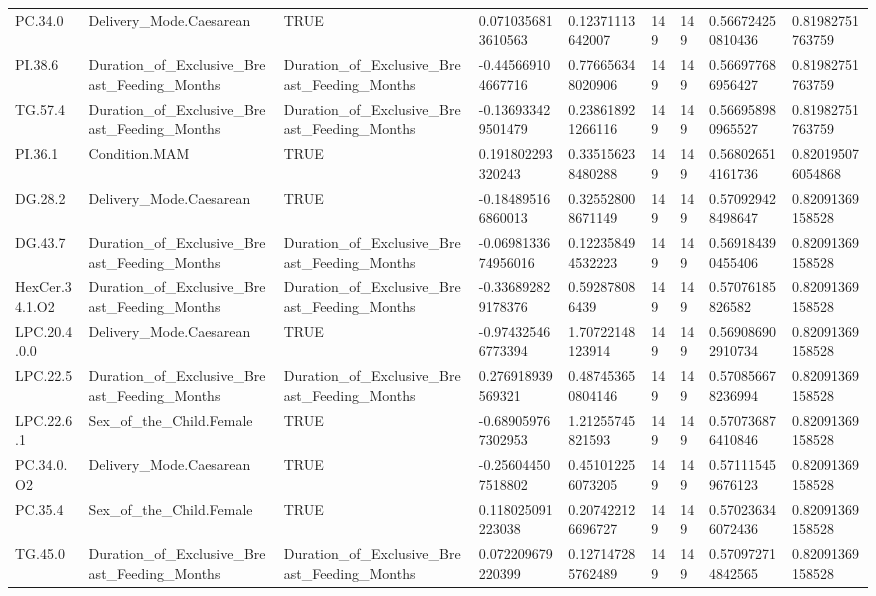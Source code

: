 \begin{longtable}{lllllllll}
PC.34.0 & Delivery\_Mode.Caesarean & TRUE & 0.0710356813610563 & 0.12371113642007 & 149 & 149 & 0.566724250810436 & 0.81982751763759 \\
PI.38.6 & Duration\_of\_Exclusive\_Breast\_Feeding\_Months & Duration\_of\_Exclusive\_Breast\_Feeding\_Months & -0.445669104667716 & 0.776656348020906 & 149 & 149 & 0.566977686956427 & 0.81982751763759 \\
TG.57.4 & Duration\_of\_Exclusive\_Breast\_Feeding\_Months & Duration\_of\_Exclusive\_Breast\_Feeding\_Months & -0.136933429501479 & 0.238618921266116 & 149 & 149 & 0.566958980965527 & 0.81982751763759 \\
PI.36.1 & Condition.MAM & TRUE & 0.191802293320243 & 0.335156238480288 & 149 & 149 & 0.568026514161736 & 0.820195076054868 \\
DG.28.2 & Delivery\_Mode.Caesarean & TRUE & -0.184895166860013 & 0.325528008671149 & 149 & 149 & 0.570929428498647 & 0.82091369158528 \\
DG.43.7 & Duration\_of\_Exclusive\_Breast\_Feeding\_Months & Duration\_of\_Exclusive\_Breast\_Feeding\_Months & -0.0698133674956016 & 0.122358494532223 & 149 & 149 & 0.569184390455406 & 0.82091369158528 \\
HexCer.34.1.O2 & Duration\_of\_Exclusive\_Breast\_Feeding\_Months & Duration\_of\_Exclusive\_Breast\_Feeding\_Months & -0.336892829178376 & 0.592878086439 & 149 & 149 & 0.57076185826582 & 0.82091369158528 \\
LPC.20.4.0.0 & Delivery\_Mode.Caesarean & TRUE & -0.974325466773394 & 1.70722148123914 & 149 & 149 & 0.569086902910734 & 0.82091369158528 \\
LPC.22.5 & Duration\_of\_Exclusive\_Breast\_Feeding\_Months & Duration\_of\_Exclusive\_Breast\_Feeding\_Months & 0.276918939569321 & 0.487453650804146 & 149 & 149 & 0.570856678236994 & 0.82091369158528 \\
LPC.22.6.1 & Sex\_of\_the\_Child.Female & TRUE & -0.689059767302953 & 1.21255745821593 & 149 & 149 & 0.570736876410846 & 0.82091369158528 \\
PC.34.0.O2 & Delivery\_Mode.Caesarean & TRUE & -0.256044507518802 & 0.451012256073205 & 149 & 149 & 0.571115459676123 & 0.82091369158528 \\
PC.35.4 & Sex\_of\_the\_Child.Female & TRUE & 0.118025091223038 & 0.207422126696727 & 149 & 149 & 0.570236346072436 & 0.82091369158528 \\
TG.45.0 & Duration\_of\_Exclusive\_Breast\_Feeding\_Months & Duration\_of\_Exclusive\_Breast\_Feeding\_Months & 0.072209679220399 & 0.127147285762489 & 149 & 149 & 0.570972714842565 & 0.82091369158528 \\

\end{longtable}
